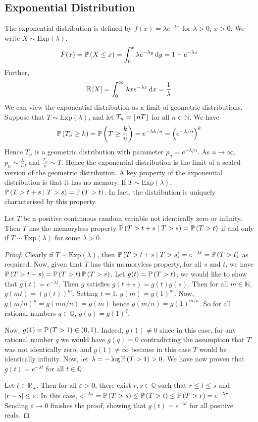 \subsection{Exponential Distribution}
The exponential distribution is defined by \(f(x) = \lambda e^{-\lambda x}\) for \(\lambda > 0\), \(x > 0\).
We write \(X \sim \mathrm{Exp}(\lambda)\).
\[
	F(x) = \mathbb{P}\left({X \leq x}\right) = \int_0^x \lambda e^{-\lambda y} \dd{y} = 1 - e^{-\lambda x}
\]
Further,
\[
	\mathbb{E}\left[{X}\right] = \int_0^\infty \lambda x e^{-\lambda x} \dd{x} = \frac{1}{\lambda}
\]
We can view the exponential distribution as a limit of geometric distributions.
Suppose that \(T \sim \mathrm{Exp}(\lambda)\), and let \(T_n = \lfloor nT\rfloor\) for all \(n \in \mathbb N\).
We have
\[
	\mathbb{P}\left({T_n \geq k}\right) = \mathbb{P}\left({T \geq \frac{k}{n}}\right) = e^{-\lambda k / n} = \left( e^{-\lambda/n} \right)^k
\]
Hence \(T_n\) is a geometric distribution with parameter \(p_n = e^{-\lambda/n}\).
As \(n \to \infty\), \(p_n \sim \frac{\lambda}{n}\), and \(\frac{T_n}{n} \sim T\).
Hence the exponential distribution is the limit of a scaled version of the geometric distribution.
A key property of the exponential distribution is that it has no memory.
If \(T \sim \mathrm{Exp}(\lambda)\), \(\mathbb{P}\left({T > t + s \mid T > s}\right) = \mathbb{P}\left({T > t}\right)\).
In fact, the distribution is uniquely characterised by this property.
\begin{proposition}
	Let \(T\) be a positive continuous random variable not identically zero or infinity.
	Then \(T\) has the memoryless property \(\mathbb{P}\left({T > t + s \mid T > s}\right) = \mathbb{P}\left({T > t}\right)\) if and only if \(T \sim \mathrm{Exp}(\lambda)\) for some \(\lambda > 0\).
\end{proposition}
\begin{proof}
	Clearly if \(T \sim \mathrm{Exp}(\lambda)\), then \(\mathbb{P}\left({T > t + s \mid T > s}\right) = e^{-\lambda t} = \mathbb{P}\left({T > t}\right)\) as required.
	Now, given that \(T\) has this memoryless property, for all \(s\) and \(t\), we have \(\mathbb{P}\left({T > t + s}\right) = \mathbb{P}\left({T > t}\right) \mathbb{P}\left({T > s}\right)\).
	Let \(g(t) = \mathbb{P}\left({T > t}\right)\); we would like to show that \(g(t) = e^{-\lambda t}\).
	Then \(g\) satisfies \(g(t+s) = g(t)g(s)\).
	Then for all \(m \in \mathbb N\), \(g(mt) = (g(t))^m\).
	Setting \(t=1\), \(g(m) = g(1)^m\).
	Now, \(g(m/n)^n = g(mn/n) = g(m)\) hence \(g(m/n) = g(1)^{m/n}\).
	So for all rational numbers \(q \in \mathbb Q\), \(g(q) = g(1)^q\).

	Now, \(g(1) = \mathbb{P}\left({T > 1}\right) \in (0, 1)\).
	Indeed, \(g(1) \neq 0\) since in this case, for any rational number \(q\) we would have \(g(q) = 0\) contradicting the assumption that \(T\) was not identically zero, and \(g(1) \neq \infty\) because in this case \(T\) would be identically infinity.
	Now, let \(\lambda = -\log\mathbb{P}\left({T > 1}\right) > 0\).
	We have now proven that \(g(t) = e^{-\lambda t}\) for all \(t\in\mathbb Q\).

	Let \(t \in \mathbb R_+\).
	Then for all \(\varepsilon > 0\), there exist \(r, s \in \mathbb Q\) such that \(r \leq t \leq s\) and \(\abs{r - s} \leq \varepsilon\).
	In this case, \(e^{-\lambda s} = \mathbb{P}\left({T > s}\right) \leq \mathbb{P}\left({T > t}\right) \leq \mathbb{P}\left({T > r}\right) = e^{-\lambda r}\).
	Sending \(\varepsilon \to 0\) finishes the proof, showing that \(g(t) = e^{-\lambda t}\) for all positive reals.
\end{proof}


